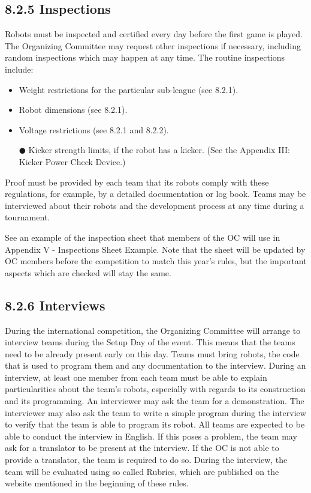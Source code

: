 \documentclass{article}
\begin{document}
\subsection{8.2.5 Inspections \label{ref-059}}

Robots must be inspected and certified every day before the first game is played. The Organizing Committee may request other inspections if necessary, \textcolor{color-5}{including random inspections which may happen at any time}. The routine inspections include:

\begin{itemize}
\item Weight restrictions for the particular sub-league (see 8.2.1). 

\item Robot dimensions (see 8.2.1). 

\item Voltage restrictions (see 8.2.1 and 8.2.2). 

${\CIRCLE}$ Kicker strength limits, if the robot has a kicker. (See the Appendix \textcolor{color-5}{III}: Kicker Power Check Device.)

\end{itemize}
Proof must be provided by each team that its robots comply with these regulations, for example, by a detailed documentation or log book. Teams may be interviewed about their robots and the development process at any time during a tournament.

\textcolor{color-5}{See an example of the inspection sheet that members of the OC will use in Appendix V - Inspections Sheet Example. Note that the sheet will be updated by OC members before the competition to match this year's rules, but the important aspects which are checked will stay the same.}

\subsection{8.2.6 Interviews \label{ref-060}}

\textcolor{color-5}{During the international competition, the Organizing Committee will arrange to interview teams during the Setup Day of the event. This means that the teams need to be already present early on this day. Teams must bring robots, the code that is used to program them and any documentation to the interview. During an interview, at least one member from each team must be able to explain particularities about the team's robots, especially with regards to its construction and its programming. An interviewer may ask the team for a demonstration. The interviewer may also ask the team to write a simple program during the interview to verify that the team is able to program its robot. All teams are expected to be able to conduct the interview in English. If this poses a problem, the team may ask for a translator to be present at the interview. If the OC is not able to provide a translator, the team is required to do so. During the interview, the team will be evaluated using so called Rubrics, which are published on the website mentioned in the beginning of these rules.}
\end{document}
